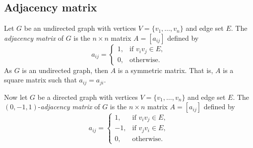 
\subsection{Adjacency matrix}

Let $G$ be an undirected graph with vertices
$V = \{ v_1, \dots, v_n \}$ and edge set $E$. The
\emph{adjacency matrix} of $G$ is the $n \times n$ matrix
$A = [a_{ij}]$ defined by
\[
a_{ij}
=
\begin{cases}
1, & \text{if $v_i v_j \in E$}, \\[4pt]
0, & \text{otherwise}.
\end{cases}
\]
As $G$ is an undirected graph, then $A$ is a symmetric matrix. That
is, $A$ is a square matrix such that $a_{ij} = a_{ji}$.

Now let $G$ be a directed graph with vertices
$V = \{ v_1, \dots, v_n \}$ and edge set $E$. The
$(0, -1, 1)$-\emph{adjacency matrix} of $G$ is
the $n \times n$ matrix $A = [a_{ij}]$ defined by
\[
a_{ij}
=
\begin{cases}
1,  & \text{if $v_i v_j \in E$}, \\[4pt]
-1, & \text{if $v_j v_i \in E$}, \\[4pt]
0,  & \text{otherwise}.
\end{cases}
\]

